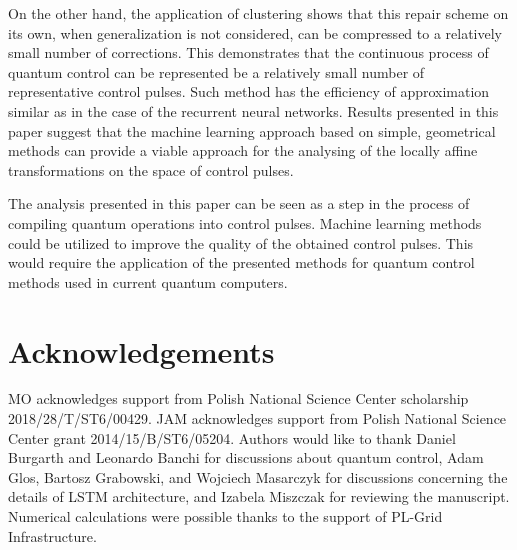 \documentclass[aps,pra,showkeys,showpacs,notitlepage,superscriptaddress]{revtex4-1}
\newcommand{\1}{{\rm 1\hspace{-0.9mm}l}}
\begin{document}
On the other hand, the application of clustering shows that this repair scheme 
on its own, when generalization is not considered, can be compressed to a 
relatively small number of corrections. This demonstrates that the continuous 
process of quantum control can be represented be a relatively small number of 
representative control pulses. Such method has the efficiency of 
approximation similar as in the case of the recurrent neural networks. 
Results presented in this paper suggest that the machine learning approach 
based on simple, geometrical methods can provide a viable approach for the 
analysing of the locally affine transformations on the space of control pulses.

The analysis presented in this paper can be seen as a step in the process of compiling quantum operations into control pulses. Machine learning methods could be utilized to improve the quality of the obtained control pulses. This would require the application of the presented methods for quantum control methods used in current quantum computers.


\section*{Acknowledgements}
  MO acknowledges
  support from Polish National Science Center scholarship 2018/28/T/ST6/00429. JAM
  acknowledges support from Polish National Science Center grant
  2014/15/B/ST6/05204. Authors would like to thank Daniel Burgarth and Leonardo Banchi for discussions about quantum control, Adam Glos, Bartosz Grabowski, and Wojciech Masarczyk for discussions concerning the details of LSTM architecture, and Izabela Miszczak for reviewing the manuscript. Numerical calculations
  were  possible thanks  to the support  of PL-Grid  Infrastructure.
  

%
%
%
\end{document}
